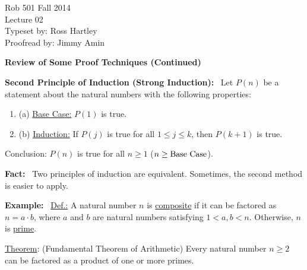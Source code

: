 \documentclass[letterpaper]{article}
\begin{document}
\baselineskip=48pt  %


\setlength{\parskip}{.3in}
\setlength{\itemsep}{.3in}

\pagestyle{plain}

{\Large \bf
\begin{center}
Rob 501 Fall 2014\\
Lecture 02\\
Typeset by:  Ross Hartley\\
Proofread by: Jimmy Amin
\end{center}
}

\Large

\Large
\begin{center}
\textbf{Review of Some Proof Techniques (Continued)}
\end{center}

\noindent \textbf{Second Principle of Induction (Strong Induction):}~ Let $P(n)$ be a statement about the natural numbers with the following properties:
    \begin{enumerate}
        \item[] (a) \underline{Base Case:} $P(1)$ is true.
        \item[] (b) \underline{Induction:} If $P(j)$ is true for all $1\leq j\leq k$, then $P(k+1)$ is true.
    \end{enumerate}
    Conclusion: $P(n)$ is true for all $n\geq 1$ ($n\geq \textnormal{Base Case}$).

\noindent \textbf{Fact:}~ Two principles of induction are equivalent. Sometimes, the second method is easier to apply.

\noindent \textbf{Example:}~
    \newline
    \underline{Def.:} A natural number $n$ is \underline{composite} if it can be factored as $n=a\cdot b$, where $a$ and $b$ are natural numbers satisfying $1 < a,  b < n$. Otherwise, $n$ is \underline{prime}.

    \underline{Theorem}: (Fundamental Theorem of Arithmetic) Every natural number $n\geq 2$ can be factored as a product of one or more primes.
\end{document}
